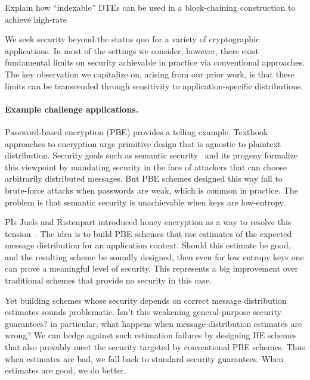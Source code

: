 Explain how ``indexable'' DTEs can be used in a block-chaining construction to
achieve high-rate 


We seek security beyond the status quo for a variety of cryptographic
applications. In most of the settings we consider, however, there exist
fundamental limits on security achievable in practice via conventional
approaches.  The key observation we capitalize on, arising from our prior
work, is that these limits can be transcended through sensitivity to application-specific distributions. 

\paragraph{Example challenge applications.}
Password-based encryption (PBE) provides a telling example. Textbook approaches to
encryption urge primitive design that is agnostic to plaintext distribution. Security
goals such as semantic security~\cite{..} and its progeny formalize this
viewpoint by mandating security in the face of attackers that can choose
arbitrarily distributed messages. 
But PBE schemes designed this way fall to brute-force attacks when passwords are
weak, which is common in practice. The problem is that semantic security is
unachievable when keys are low-entropy. 

PIs Juels and Ristenpart introduced honey encryption as a way to resolve this
tension~\cite{HoneyEnc-EC:2014}. The idea is to build PBE schemes that use
estimates of the expected message
distribution for an application context. Should this estimate be
good, and the resulting scheme be soundly designed, then even for low entropy keys 
one can prove a meaningful level of security. This represents a big improvement 
over traditional schemes that provide no security in this case. 

Yet building schemes whose security depends on correct message distribution
estimates sounds problematic. Isn't this weakening general-purpose security
guarantees? in particular, what happens when message-distribution estimates are
wrong?  We can hedge against such estimation failures by designing HE schemes
that also provably meet the security targeted by conventional PBE schemes. Thus
when estimates are bad, we fall back to standard security guarantees. When
estimates are good, we do better.

